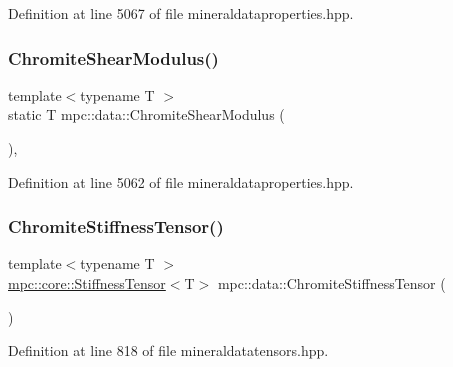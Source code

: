 Definition at line 5067 of file mineraldataproperties.\+hpp.

\mbox{\label{namespacempc_1_1data_a6218c8e6fd3dbfac80bbaccad7e5fd44}} 
\subsubsection{\texorpdfstring{Chromite\+Shear\+Modulus()}{ChromiteShearModulus()}}
{\footnotesize\ttfamily template$<$typename T $>$ \\
static T mpc\+::data\+::\+Chromite\+Shear\+Modulus (\begin{DoxyParamCaption}{ }\end{DoxyParamCaption})\hspace{0.3cm}{\ttfamily [inline]}, {\ttfamily [static]}}



Definition at line 5062 of file mineraldataproperties.\+hpp.

\mbox{\label{namespacempc_1_1data_a64227191a094294f3fcf307925258334}} 
\subsubsection{\texorpdfstring{Chromite\+Stiffness\+Tensor()}{ChromiteStiffnessTensor()}}
{\footnotesize\ttfamily template$<$typename T $>$ \\
\mbox{\hyperlink{structmpc_1_1core_1_1_stiffness_tensor}{mpc\+::core\+::\+Stiffness\+Tensor}}$<$T$>$ mpc\+::data\+::\+Chromite\+Stiffness\+Tensor (\begin{DoxyParamCaption}{ }\end{DoxyParamCaption})}



Definition at line 818 of file mineraldatatensors.\+hpp.

\mbox{\label{namespacempc_1_1data_a77b6c5a9fe1dd4cd6c0af98de6e10e4d}} 
